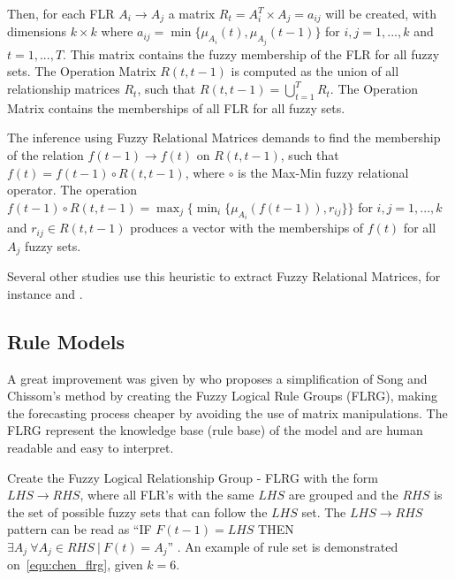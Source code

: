 Then, for each FLR $A_i\rightarrow A_j$  a matrix $R_t = A_i^T \times A_j = a_{ij}$ will be created, with dimensions $k \times k$ where $a_{ij} = \min\{\mu_{A_i}(t),\mu_{A_j}(t-1)\}$ for $i,j = 1,...,k$ and $t = 1,...,T$. This matrix contains the fuzzy membership of the FLR for all fuzzy sets. The Operation Matrix $R(t,t-1)$ is computed as the union of all relationship matrices $R_t$, such that $ R(t,t-1) = \bigcup_{t=1}^T R_t$. The Operation Matrix contains the memberships of all FLR for all fuzzy sets.

The inference using Fuzzy Relational Matrices  demands to find the membership of the relation $f(t-1) \rightarrow f(t)$ on $R(t,t-1)$, such that $f(t) = f(t-1)\circ R(t,t-1)$, where $\circ$ is the Max-Min fuzzy relational operator. The operation $f(t-1)\circ R(t,t-1) = \max_j\{\min_i\{ \mu_{A_i}( f(t-1)), r_{ij}  \} \}$ for $i,j = 1,...,k$ and $r_{ij} \in R(t,t-1)$ produces a vector with the memberships of $f(t)$ for all $A_j$ fuzzy sets.

Several other studies use this heuristic to extract Fuzzy Relational Matrices, for instance \cite{Song1997, hwang1998handling, Song1999, Chen2000, Chen2006a,  Cheng2008, Jilani2008a, Davari2009, Qiu2011,Cheng2012, Qiu2013} and \cite{Chuang2014}.

%
\subsection{Rule Models}
\label{sec:fts_rules}

A great improvement was given by \cite{chen1996forecasting} who proposes a  simplification of Song and Chissom's method by creating the Fuzzy Logical Rule Groups (FLRG), making the forecasting process cheaper by avoiding the use of matrix manipulations. The FLRG represent the knowledge base (rule base) of the model and are human readable and easy to interpret.

Create the Fuzzy Logical Relationship Group - FLRG with the form $LHS \rightarrow RHS$, where all FLR's with the same $LHS$ are grouped and the $RHS$ is the set of possible fuzzy sets that can follow the $LHS$ set. The $LHS \rightarrow RHS$ pattern can be read as ``IF $F(t-1) = LHS$ THEN $\exists A_j\ \forall A_j \in RHS\ |\ F(t) = A_j$'' . An example of rule set is demonstrated on~\eqref{equ:chen_flrg}, given $k=6$. 


